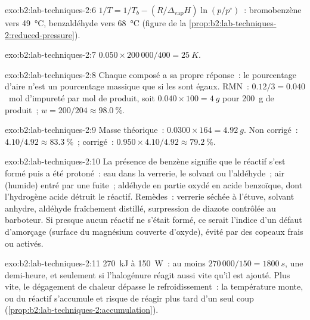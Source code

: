 \begin{solution}{exo:b2:lab-techniques-2:6}
$1/T = 1/T_b - (R/\Delta_{\mathrm{vap}}H)\ln(p/p^\circ)$~: bromobenzène vers \qty{49}{\degreeCelsius},
benzaldéhyde vers \qty{68}{\degreeCelsius} (figure de la \cref{prop:b2:lab-techniques-2:reduced-pressure}).
\end{solution}

\begin{solution}{exo:b2:lab-techniques-2:7}
$0.050 \times 200\,000/400 = \qty{25}{K}$.
\end{solution}

\begin{solution}{exo:b2:lab-techniques-2:8}
Chaque composé a sa propre réponse~: le pourcentage d'aire n'est un pourcentage massique que si les  sont égaux. RMN~: $0.12/3 = 0.040$~mol d'impureté par mol de produit, soit $0.040 \times 100 = \qty{4}{g}$
pour \qty{200}{g} de produit~; $w = 200/204 \approx 98.0~\%$.
\end{solution}

\begin{solution}{exo:b2:lab-techniques-2:9}
Masse théorique~: $0.0300 \times 164 = \qty{4.92}{g}$. Non corrigé~: $4.10/4.92 \approx 83.3~\%$~; corrigé~:
$0.950 \times 4.10/4.92 \approx 79.2~\%$.
\end{solution}

\begin{solution}{exo:b2:lab-techniques-2:10}
La présence de benzène signifie que le réactif s'est formé puis a été protoné~: eau dans la verrerie, le
solvant ou l'aldéhyde~; air (humide) entré par une fuite~; aldéhyde en partie oxydé en acide benzoïque, dont
l'hydrogène acide détruit le réactif. Remèdes~: verrerie séchée à l'étuve, solvant anhydre, aldéhyde
fraîchement distillé, surpression de diazote contrôlée au barboteur. Si presque aucun réactif ne s'était
formé, ce serait l'indice d'un défaut d'amorçage (surface du magnésium couverte d'oxyde), évité par des
copeaux frais ou activés.
\end{solution}

\begin{solution}{exo:b2:lab-techniques-2:11}
\qty{270}{kJ} à \qty{150}{W}~: au moins $270\,000/150 = \qty{1800}{s}$, une demi-heure, et seulement si
l'halogénure réagit aussi vite qu'il est ajouté. Plus vite, le dégagement de chaleur dépasse le
refroidissement~: la température monte, ou du réactif s'accumule et risque de réagir plus tard d'un seul
coup (\cref{prop:b2:lab-techniques-2:accumulation}).
\end{solution}


